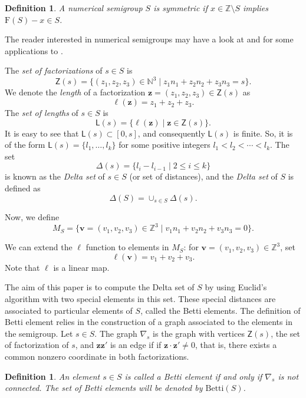 \documentclass[11pt]{amsart}
\newtheorem{defn}[theorem]{Definition}
\theoremstyle{remark}
\begin{document}
\begin{defn}
	A numerical semigroup $S$ is symmetric if $x\in \mathbb Z\setminus S$ implies $\mathrm F(S)-x\in S$.
\end{defn}
The reader interested in numerical semigroups may have a look at \cite{RG} and for some applications to \cite{AG-S}. 

The \emph{set of factorizations} of $s\in S$ is \[\mathsf Z(s)=\{(z_1,z_2,z_3)\in \mathbb N^3 \mid z_1n_1+z_2n_2+z_3n_3=s\}.\] We denote the \emph{length} of a factorization $\mathbf z=(z_1,z_2,z_3)\in \mathsf Z(s)$ as \[\ell(\mathbf z)=z_1+z_2+z_3.\] The \emph{set of lengths} of $s\in S$ is 
\[\mathsf L(s)=\{\ell(\mathbf z)\mid \mathbf z\in\mathsf Z(s)\}.\] It is easy to see that $\mathsf L(s) \subset [0,s]$, and consequently $\mathsf L(s)$ is finite. So, it is of the form $\mathsf L(s)=\{l_1,\ldots ,l_k\}$ for some positive integers $l_1<l_2<\cdots <l_k$.  The set
\[
\Delta(s)=\{l_i-l_{i-1} \mid 2\le i\le k\}
\]
is known as the \emph{Delta set} of $s \in S$ (or set of distances), and 
the \emph{Delta set} of $S$ is defined as
\[\Delta(S)=\cup_{s \in S}\Delta(s).\]

Now, we define 
\[
M_S=\{ \mathbf v=(v_1,v_2,v_3)\in \mathbb Z^3\mid v_1n_1+v_2n_2+v_3n_3=0\}.
\]


We can extend the $\ell$ function to elements in $M_S$: for $\mathbf v=(v_1,v_2,v_3)\in \mathbb Z^3$, set 
\[
\ell(\mathbf v)=v_1+v_2+v_3.
\]
Note that $\ell$ is a linear map.

The aim of this paper is to compute the Delta set of $S$ by using Euclid's algorithm with two special elements in this set. These special distances are associated to particular elements of $S$, called the Betti elements. The definition of Betti element relies in the construction of a graph associated to the elements in the semigroup. Let $s\in S$. The graph $\nabla_s$ is the graph with vertices $\mathsf Z(s)$, the set of factorization of $s$, and $\mathbf z\mathbf z'$ is an edge if if $\mathbf z\cdot\mathbf z'\neq 0$, that is, there exists a common nonzero coordinate in both factorizations.

\begin{defn}
	An element $s\in S$ is called a Betti element if and only if $\nabla_s$ is not connected. The set of Betti elements will be denoted by $\mathrm{Betti}(S)$.
\end{defn}
\end{document}
